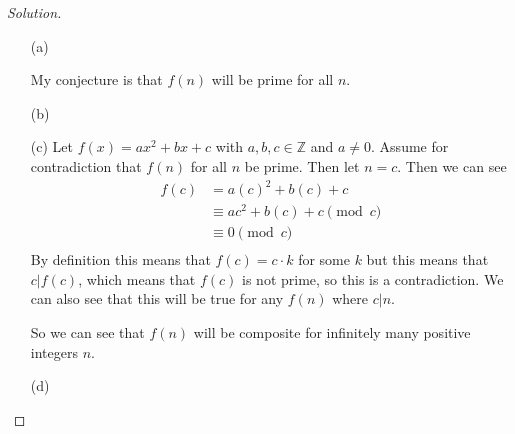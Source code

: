 \documentclass[11pt]{article}
\newcommand{\Z}{\mathbb{Z}}
\newenvironment{solution}
  {\renewcommand\qedsymbol{$~$}\begin{proof}[Solution]$ $\par\nobreak\ignorespaces}
  {\end{proof}}
\begin{document}
\begin{solution}
    \begin{itemize}
        \item [(a)]
              

              
              My conjecture is that $f(n)$ will be prime for all $n$.
        \item [(b)]
              

              
        \item [(c)] Let $f(x)=ax^2+bx+c$ with $a,b,c\in\Z$ and $a\neq 0$. Assume for contradiction that $f(n)$ for all $n$ be prime. Then let $n=c$. Then we can see
              \begin{align*}
                  f(c) & = a(c)^2 + b(c) + c             \\
                       & \equiv ac^2 + b(c) + c \pmod{c} \\
                       & \equiv 0 \pmod{c}               \\
              \end{align*}
              By definition this means that $f(c)= c\cdot k$ for some $k$ but this means that $c|f(c)$, which means that $f(c)$ is not prime, so this is a contradiction. We can also see that this will be true for any $f(n)$ where $c|n$.

              So we can see that $f(n)$ will be composite for infinitely many positive integers $n$.
        \item [(d)]
    \end{itemize}
\end{solution}
\end{document}
